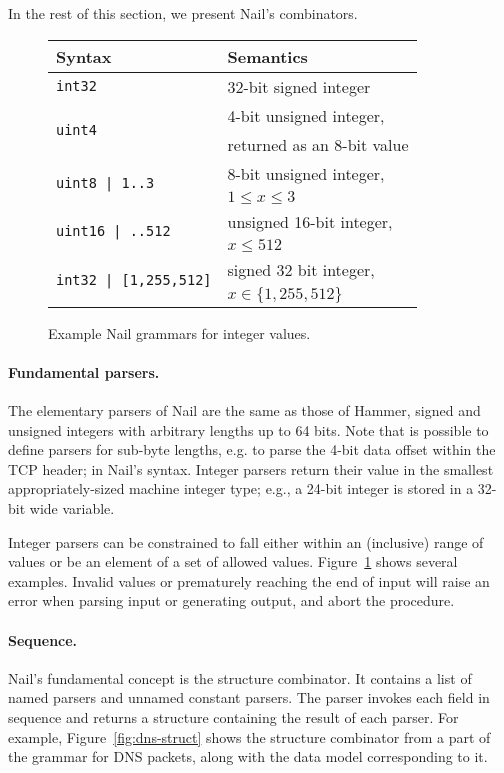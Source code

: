 \noindent
In the rest of this section, we present Nail's combinators.

\begin{figure}[tb]
\begin{tabular}{ll}
\toprule
\bf Syntax & \bf Semantics \\
\midrule
\texttt{int32} & 32-bit signed integer \\
\multirow{2}{*}{\texttt{uint4}}
  & 4-bit unsigned integer, \\
  & returned as an 8-bit value \\
\multirow{2}{*}{\texttt{uint8 | 1..3}}
  & 8-bit unsigned integer, \\
  & $1\leq x \leq 3$ \\
\multirow{2}{*}{\texttt{uint16 | ..512}}
  & unsigned 16-bit integer, \\
  & $x \leq 512$ \\
\multirow{2}{*}{\texttt{int32 | [1,255,512]}}
  & signed 32 bit integer, \\
  & $x \in \{ 1, 255, 512 \}$ \\
\bottomrule
\end{tabular}
\caption{Example Nail grammars for integer values.}
\label{fig:range}
\end{figure}

\paragraph{Fundamental parsers.}
The elementary parsers of Nail are the same as those of Hammer, signed
and unsigned integers with arbitrary lengths up to 64 bits.  Note that is
possible to define parsers for sub-byte lengths, e.g. to parse the 4-bit
data offset within the TCP header; in Nail's syntax.  Integer parsers
return their value in the smallest appropriately-sized machine integer
type; e.g., a 24-bit integer is stored in a 32-bit wide variable.

Integer parsers can be constrained to fall either within an (inclusive)
range of values or be an element of a set of allowed values.
Figure~\ref{fig:range} shows several examples.
Invalid values or prematurely reaching the end of input will raise an
error when parsing input or generating output, and abort the procedure.


\paragraph{Sequence.}

Nail's fundamental concept is the structure combinator. It contains a list of
named parsers and unnamed constant parsers. The parser invokes each field 
in sequence and returns a structure containing the result of each parser.
For example, Figure~\ref{fig:dns-struct} shows the structure combinator
from a part of the grammar for DNS packets, along with the data model
corresponding to it.

